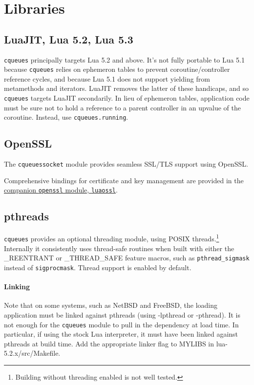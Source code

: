 \documentclass[11pt, oneside]{memoir}
\newcommand*{\cqueues}[0]{\texttt{cqueues}\xspace}
\newcommand*{\syscall}[1]{\texttt{#1}\xspace}
\newcommand*{\fn}[1]{\texttt{#1}\xspace}
\newcommand*{\module}[1]{\texttt{#1}\xspace}
\begin{document}
\section{Libraries}

\subsection{LuaJIT, Lua 5.2, Lua 5.3}
\cqueues principally targets Lua 5.2 and above. It's not fully portable to Lua 5.1 because \cqueues relies on ephemeron tables to prevent coroutine/controller reference cycles, and because Lua 5.1 does not support yielding from metamethods and iterators. LuaJIT removes the latter of these handicaps, and so \cqueues targets LuaJIT secondarily. In lieu of ephemeron tables, application code must be sure not to hold a reference to a parent controller in an upvalue of the coroutine. Instead, use \fn{cqueues.running}.

\subsection{OpenSSL}
The \cqueues \module{socket} module provides seamless SSL/TLS support using OpenSSL.

Comprehensive bindings for certificate and key management are provided in the \href{http://25thandClement.com/~william/projects/luaossl.html}{companion \module{openssl} module, \texttt{luaossl}}.

\subsection{pthreads}

\cqueues provides an optional threading module, using POSIX threads.\footnote{Building without threading enabled is not well tested.} Internally it consistently uses thread-safe routines when built with either the \_REENTRANT or \_THREAD\_SAFE feature macros, such as \syscall{pthread\_sigmask} instead of \syscall{sigprocmask}. Thread support is enabled by default.

\paragraph{Linking}
Note that on some systems, such as NetBSD and FreeBSD, the loading application must be linked against pthreads (using -lpthread or -pthread). It is not enough for the \cqueues module to pull in the dependency at load time. In particular, if using the stock Lua interpreter, it must have been linked against pthreads at build time. Add the appropriate linker flag to MYLIBS in lua-5.2.x/src/Makefile.
\end{document}
